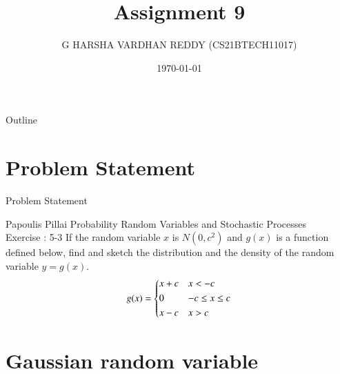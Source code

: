 \documentclass{beamer}
\title{Assignment 9}
\author[CS21BTECH11017]{G HARSHA VARDHAN REDDY (CS21BTECH11017)}
\date{\today}
\begin{document}
\begin{frame}
    \titlepage 
\end{frame}
\logo{}


\begin{frame}{Outline}
    \tableofcontents
\end{frame}




\section{Problem Statement}
\begin{frame}{Problem Statement}

    \begin{block} {Papoulis Pillai Probability Random Variables and Stochastic Processes\\ 
    Exercise : 5-3} If the random variable $x$ is $N(0,c^2)$ and $g(x)$ is a function defined below,  find and sketch the
     distribution and the density of the random variable $y=g(x)$.
    \begin{align}
        g(x)=
    \begin{dcases}
        x+c & x < -c \\
        0 & -c \leq x \leq c \\
        x-c & x > c \\
    \end{dcases}
    \label{1}
    \end{align}
    \end{block}
    
\end{frame}


\section{Gaussian random variable}
\end{document}
